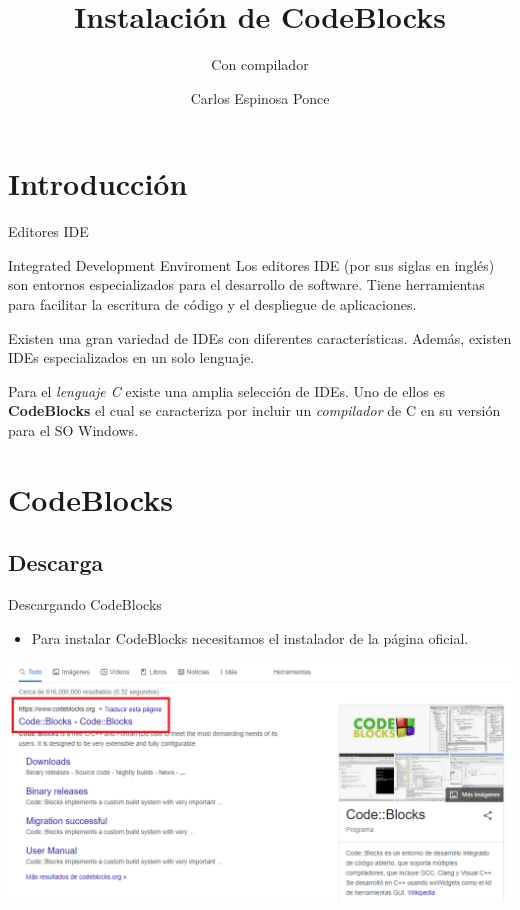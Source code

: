 \documentclass[11pt]{beamer}
\institute{Facultad de Ciencias \\ Universidad Nacional Autónoma de México}
\author[C. Espinosa]{Carlos Espinosa Ponce}
\title{Instalación de CodeBlocks}
\subtitle{Con compilador}
\begin{document}
\begin{frame}
\maketitle    
\end{frame}

\section{Introducción}
\begin{frame}{Editores IDE}
    \begin{block}{Integrated Development Enviroment}
    \justifying
    Los editores IDE (por sus siglas en inglés) son entornos especializados para el desarrollo de software. Tiene herramientas para facilitar la escritura de código y el despliegue de aplicaciones.
    \end{block}
    \justifying
    Existen una gran variedad de IDEs con diferentes características. Además, existen IDEs especializados en un solo lenguaje.
    
    Para el \emph{lenguaje C} existe una amplia selección de IDEs. Uno de ellos es \textbf{CodeBlocks} el cual se caracteriza por incluir un \emph{compilador} de C en su versión para el SO Windows.
\end{frame}

\section{CodeBlocks}
\subsection{Descarga}
\begin{frame}{Descargando CodeBlocks}
    \justifying
\begin{itemize}
    \item Para instalar CodeBlocks necesitamos el instalador de la página oficial.
\end{itemize}
    \includegraphics[width=\textwidth]{cb1.png}
\end{frame}
\end{document}
